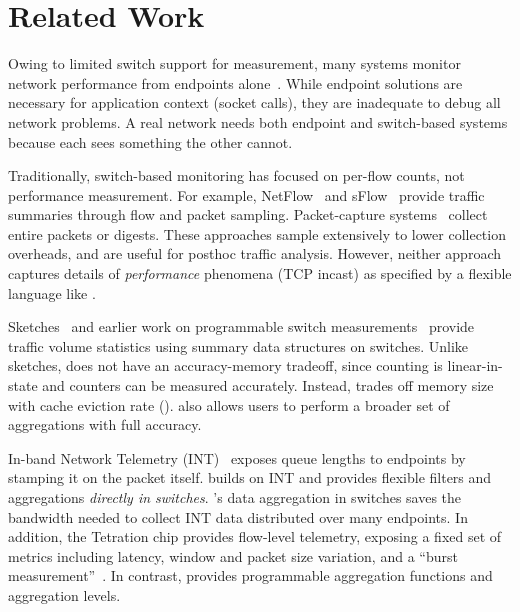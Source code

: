 \section{Related Work}
\label{sec:related}
 Owing to limited switch support for
measurement, many systems monitor network performance from
endpoints alone~\cite{netpoirot, minlan-snap, dapper-sosr, trumpet,
azure-smartnic}. While endpoint solutions are necessary for application
context (\eg socket calls), they are inadequate to debug all network problems. A
real network needs both endpoint and switch-based
systems because each sees something the other cannot.

 Traditionally, switch-based monitoring has
focused on per-flow counts, not performance measurement. For example,
NetFlow~\cite{netflow} and sFlow~\cite{sflow} provide traffic summaries
through flow and packet sampling. Packet-capture systems~\cite{cisco-span,
niksun, netsight, everflow, pathdump, path_query} collect entire packets or
digests. These approaches sample extensively to lower collection
overheads, and are useful for posthoc traffic analysis. However, neither
approach captures details of {\em performance} phenomena (\eg TCP incast) as
specified by a flexible language like \TheSystem.

Sketches~\cite{univmon, flowradar, counterbraids, dream} and earlier work
on programmable switch measurements~\cite{progme, opensketch} provide traffic
volume statistics using summary data structures on switches.  Unlike sketches,
\TheSystem does
not have an accuracy-memory tradeoff, since counting is
linear-in-state and counters can be measured accurately. Instead, \TheSystem
trades off memory size with cache eviction rate (). \TheSystem also
allows users to perform a broader set of aggregations with full
accuracy.


%

In-band Network Telemetry (INT)~\cite{int, tpp} exposes queue lengths to
endpoints by stamping it on the packet itself. \TheSystem builds on INT and
provides flexible filters and aggregations {\em directly in switches}.
\TheSystem's data aggregation in switches saves
the bandwidth needed to collect INT data distributed over many endpoints.
In addition, the
Tetration chip provides flow-level telemetry, exposing a fixed set of metrics
including latency, window and packet size variation, and a ``burst
measurement''~\cite{tetration-telemetry}. In contrast, \TheSystem provides
programmable aggregation functions and aggregation levels.%

